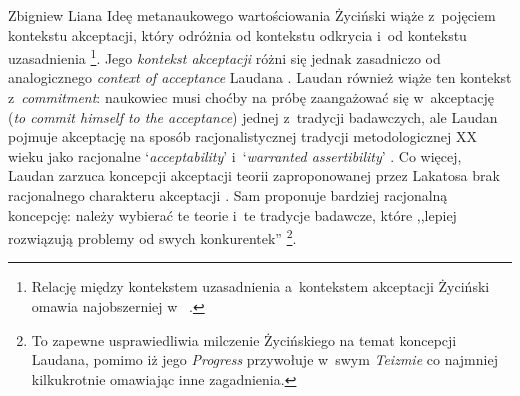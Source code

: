 \begin{artplenv}{Zbigniew Liana}
Ideę metanaukowego wartościowania Życiński wiąże z~pojęciem kontekstu akceptacji, który odróżnia od kontekstu odkrycia i~od kontekstu uzasadnienia
\parencite[zob.][s.~225]{zycinski_teizm_1985}%
\footnote{Relację między kontekstem uzasadnienia a~kontekstem akceptacji Życiński omawia najobszerniej w~
\parencite[][s.~216–232]{zycinski_teizm_1985}. %
 }. Jego \textit{kontekst akceptacji} różni się jednak zasadniczo od analogicznego \textit{context of acceptance} Laudana 
\parencite*[][s.~108nn]{laudan_progress_1977}. %
 Laudan również wiąże ten kontekst z~\textit{commitment}: naukowiec musi choćby na próbę zaangażować się w~akceptację (\textit{to commit himself to the acceptance}) jednej z~tradycji badawczych, ale Laudan pojmuje akceptację na sposób racjonalistycznej tradycji metodologicznej XX wieku jako racjonalne ‘\textit{acceptability}' i~‘\textit{warranted assertibility}' 
\parencite[][s.~110]{laudan_progress_1977}. %
 Co więcej, Laudan zarzuca koncepcji akceptacji teorii zaproponowanej przez Lakatosa brak racjonalnego charakteru akceptacji 
\parencite[][s.~77n]{laudan_progress_1977}. %
 Sam proponuje bardziej racjonalną koncepcję: należy wybierać te teorie i~te tradycje badawcze, które ,,lepiej rozwiązują problemy od swych konkurentek'' 
\parencite[][s.~109]{laudan_progress_1977}%
\footnote{To zapewne usprawiedliwia milczenie Życińskiego na temat koncepcji Laudana, pomimo iż jego \textit{Progress} 
\parencite*[][]{laudan_progress_1977} %
 przywołuje w~swym \textit{Teizmie} 
\parencite*[][]{zycinski_teizm_1985} %
 co najmniej kilkukrotnie omawiając inne zagadnienia.}.


\end{artplenv}
